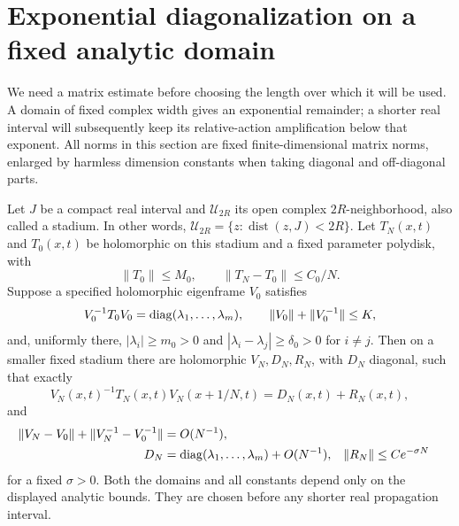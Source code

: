 \section{Exponential diagonalization on a fixed analytic domain}\label{qi:diagonalization}

We need a matrix estimate before choosing the length over which it will be used. A domain of fixed complex width gives an exponential remainder; a shorter real interval will subsequently keep its relative-action amplification below that exponent. All norms in this section are fixed finite-dimensional matrix norms, enlarged by harmless dimension constants when taking diagonal and off-diagonal parts.

\begin{lemma}\label{qi:diagonal}
Let $J$ be a compact real interval and $\mathcal U_{2R}$ its open complex $2R$-neighborhood, also called a stadium. In other
words, $\mathcal U_{2R}=\{z:\operatorname{dist}(z,J)<2R\}$. Let $T_N(x,t)$ and $T_0(x,t)$ be holomorphic on this stadium and a fixed parameter polydisk, with
\[
 \|T_0\|\le M_0,\qquad \|T_N-T_0\|\le C_0/N.
\]
Suppose a specified holomorphic eigenframe $V_0$ satisfies
\[
 V_0^{-1}T_0V_0=\operatorname{diag}(\lambda_1,\ldots,\lambda_m),\qquad
 \|V_0\|+\|V_0^{-1}\|\le K,
\]
and, uniformly there, $|\lambda_i|\ge m_0>0$ and
$|\lambda_i-\lambda_j|\ge\delta_0>0$ for $i\ne j$.
Then on a smaller fixed stadium there are holomorphic $V_N,D_N,R_N$, with $D_N$ diagonal, such that exactly
\begin{equation}\label{qi:diagonal-identity}
 V_N(x,t)^{-1}T_N(x,t)V_N(x+1/N,t)=D_N(x,t)+R_N(x,t),
\end{equation}
and
\begin{align}
 \|V_N-V_0\|+\|V_N^{-1}-V_0^{-1}\|&=O(N^{-1}),\notag\\
 D_N&=\operatorname{diag}(\lambda_1,\ldots,\lambda_m)+O(N^{-1}),&
 \|R_N\|&\le C e^{-\sigma N}\label{qi:diagonal-bounds}
\end{align}
for a fixed $\sigma>0$. Both the domains and all constants depend only on the displayed analytic bounds. They are chosen before any shorter real propagation interval.
\end{lemma}

